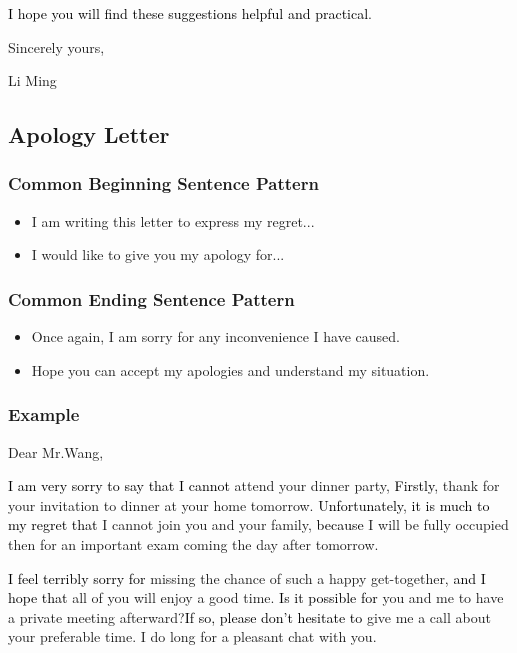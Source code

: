 \documentclass{article}
\begin{document}
\par \textcolor{black}{I hope you will find these suggestions helpful and practical}.

\hfill Sincerely yours,

\hfill Li Ming

\subsection{Apology Letter}
\label{sec:letter}

\subsubsection{Common Beginning Sentence Pattern}
\label{sec:comm-begnn-sent}
\begin{itemize}
\item I am writing this letter to express my regret...
\item I would like to give you my apology for...
\end{itemize}

\subsubsection{Common Ending Sentence Pattern}
\label{sec:comm-ending-sent-2}
\begin{itemize}
\item Once again, I am sorry for any inconvenience I have caused.
\item Hope you can accept my apologies and understand my situation.
\end{itemize}

\subsubsection{Example}
\label{sec:example-2}
Dear Mr.Wang,
\par \textcolor{black}{I am very sorry to say that I cannot }attend your dinner party,
\textcolor{black} {Firstly}, thank for your invitation to dinner at your home
tomorrow. \textcolor{black}{Unfortunately}, \textcolor{black}{it is much to my regret that} I
cannot join you and your family, \textcolor{black}{because} I will be fully occupied then
for an important exam coming the day after tomorrow.

\par \textcolor{black}{I feel terribly sorry for} missing the chance of such a happy
get-together, \textcolor{black}{and I hope that} all of you will enjoy a good
time. \textcolor{black}{Is it possible for} you and me to have a private meeting
afterward?\textcolor{black}{If so, please don't hesitate to }give me a call about your
preferable time. I do long for a pleasant chat with you.
\end{document}
